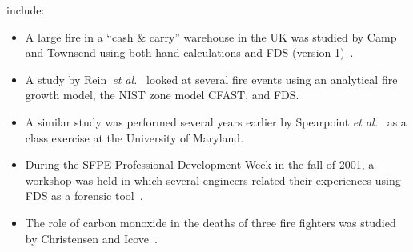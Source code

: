 include:
\begin{itemize}
\item A large fire in a ``cash \& carry'' warehouse in the UK was studied by Camp and Townsend using both hand calculations and FDS (version 1)~\cite{Camp:Interflam2001}.
\item A study by Rein~{\em et al.}~\cite{Rein:Interflam2004} looked at several fire events using an analytical fire growth model, the NIST zone model CFAST, and FDS.
\item A similar study was performed several years earlier by Spearpoint {\em et al.}~\cite{Spearpoint:ICFRE3} as a class exercise at the University of Maryland.
\item During the SFPE Professional Development Week in the fall of 2001, a workshop was held in which several engineers related their experiences using FDS as a forensic tool~\cite{Carpenter:SFPE2001}.
\item The role of carbon monoxide in the deaths of three fire fighters was studied by Christensen and Icove~\cite{Christensen:JFS}.
\end{itemize}
